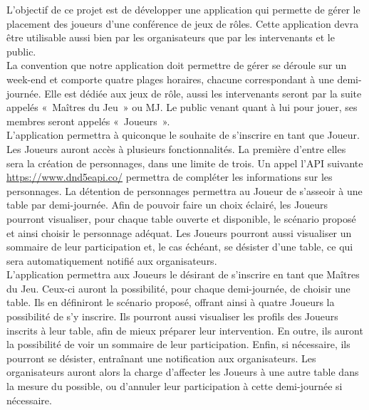 \documentclass[11pt]{article}
\begin{document}
L'objectif de ce projet est de développer une application qui permette de gérer le placement des joueurs d'une conférence de jeux de rôles. Cette application devra être utilisable aussi bien par les organisateurs que par les intervenants et le public.  \\

La convention que notre application doit permettre de gérer se déroule sur un week-end et comporte quatre plages horaires, chacune correspondant à une demi-journée. Elle est dédiée aux jeux de rôle, aussi les intervenants seront par la suite appelés «~Maîtres du Jeu~» ou MJ. Le public venant quant à lui pour jouer, ses membres seront appelés «~Joueurs~».\\ 

L'application permettra à quiconque le souhaite de s'inscrire en tant que Joueur. Les Joueurs auront accès à plusieurs fonctionnalités. La première d'entre elles sera la création de personnages, dans une limite de trois. Un appel l'API suivante \textcolor{blue}{\href{https://www.dnd5eapi.co/}{https://www.dnd5eapi.co/}} permettra de compléter les informations sur les personnages. La détention de personnages permettra au Joueur de s'asseoir à une table par demi-journée. Afin de pouvoir faire un choix éclairé, les Joueurs pourront visualiser, pour chaque table ouverte et disponible, le scénario proposé et ainsi choisir le personnage adéquat. Les Joueurs pourront aussi visualiser un sommaire de leur participation et, le cas échéant, se désister d'une table, ce qui sera automatiquement notifié aux organisateurs.\\

L'application permettra aux Joueurs le désirant de s'inscrire en tant que Maîtres du Jeu. Ceux-ci auront la possibilité, pour chaque demi-journée, de choisir une table.  Ils en définiront le scénario proposé, offrant ainsi à quatre Joueurs la possibilité de s'y inscrire. Ils pourront aussi visualiser les profils des Joueurs inscrits à leur table, afin de mieux préparer leur intervention. En outre, ils auront la possibilité de voir un sommaire de leur participation. Enfin, si nécessaire, ils pourront se désister, entraînant une notification aux organisateurs. Les organisateurs auront alors la charge d'affecter les Joueurs à une autre table dans la mesure du possible, ou d'annuler leur participation à cette demi-journée si nécessaire.\\
\end{document}
